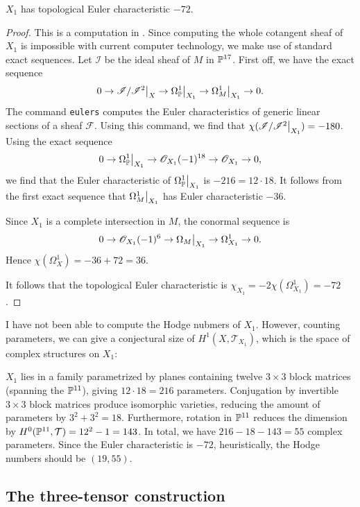 \begin{proposition}
\label{prop:x1euler} 
$X_1$ has topological Euler characteristic $-72$.
\end{proposition}
\begin{proof}
This is a computation in \MM. Since computing the whole cotangent sheaf of $X_1$ is impossible with current computer technology, we make use of standard exact sequences. Let $\mathscr I$ be the ideal sheaf of $M$ in $\P^{17}$. First off, we have the exact sequence
$$
0 \to \restr{\mathscr I/\mathscr I^2}{X} \to \restr{\Omega_\P^1}{X_1} \to \restr{\Omega_M^1}{X_1} \to 0.
$$
The \MM command \texttt{eulers} computes the Euler characteristics of generic linear sections of a sheaf $\mathscr F$. Using this command, we find that $\chi(\restr{\mathscr I/\mathscr I^2}{X_1})=-180$. Using the exact sequence
$$
0 \to \restr{\Omega_\P^1}{X_1} \to \OO_{X_1}(-1)^{18} \to \OO_{X_1} \to 0,
$$
we find that the Euler characteristic of $\restr{\Omega_\P^1}{X_1}$ is $-216=12\cdot 18$. It follows from the first exact sequence that $\restr{\Omega_M^1}{X_1}$ has Euler characteristic $-36$.

Since $X_1$ is a complete intersection in $M$, the conormal sequence is
$$
0 \to \OO_{X_1}(-1)^6 \to \restr{\Omega_M}{X_1}  \to \Omega_{X_1}^1 \to 0.
$$
Hence $\chi(\Omega_X^1) = -36+72 = 36$.

It follows that the topological Euler characteristic is $\chi_{X_1} = -2\chi(\Omega_{X_1}^1)=-72$.
\end{proof}

I have not been able to compute the Hodge nubmers of $X_1$. However, counting parameters, we can give a conjectural size of $H^1(X,\mathcal T_{X_1})$, which is the space of complex structures on $X_1$:

$X_1$ lies in a family parametrized by planes containing twelve $3 \times 3$ block matrices (spanning the $\P^{11}$), giving $12 \cdot 18=216$ parameters. Conjugation by invertible $3 \times 3$ block matrices produce isomorphic varieties, reducing the amount of parameters by $3^2 + 3^2=18$. Furthermore, rotation in $\P^{11}$ reduces the dimension by $H^0(\P^{11},\mathcal T)=12^2-1=143$. In total, we have $216-18-143=55$ complex parameters. Since the Euler characteristic is $-72$, heuristically, the Hodge numbers should be $(19,55)$. 

\subsection{The three-tensor construction}

